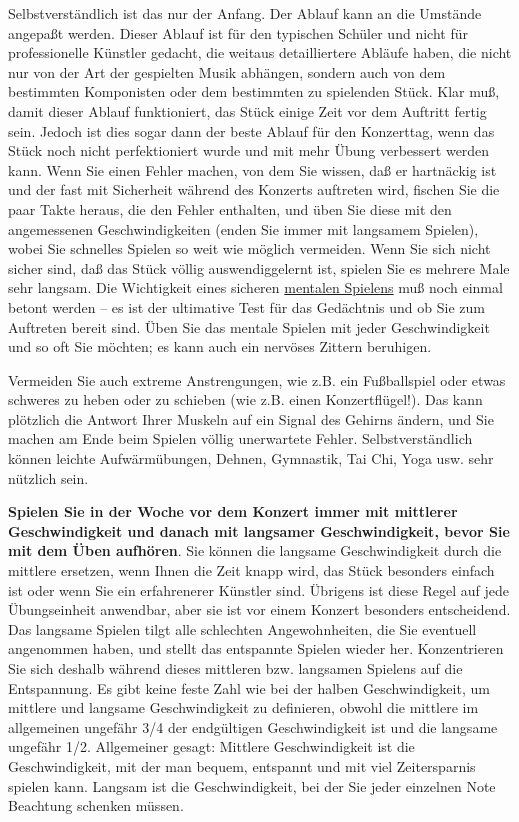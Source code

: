 Selbstverständlich ist das nur der Anfang.
Der Ablauf kann an die Umstände angepaßt werden.
Dieser Ablauf ist für den typischen Schüler und nicht für professionelle Künstler gedacht, die weitaus detailliertere Abläufe haben, die nicht nur von der Art der gespielten Musik abhängen, sondern auch von dem bestimmten Komponisten oder dem bestimmten zu spielenden Stück.
Klar muß, damit dieser Ablauf funktioniert, das Stück einige Zeit vor dem Auftritt fertig sein.
Jedoch ist dies sogar dann der beste Ablauf für den Konzerttag, wenn das Stück noch nicht perfektioniert wurde und mit mehr Übung verbessert werden kann.
Wenn Sie einen Fehler machen, von dem Sie wissen, daß er hartnäckig ist und der fast mit Sicherheit während des Konzerts auftreten wird, fischen Sie die paar Takte heraus, die den Fehler enthalten, und üben Sie diese mit den angemessenen Geschwindigkeiten (enden Sie immer mit langsamem Spielen), wobei Sie schnelles Spielen so weit wie möglich vermeiden.
Wenn Sie sich nicht sicher sind, daß das Stück völlig auswendiggelernt ist, spielen Sie es mehrere Male sehr langsam.
Die Wichtigkeit eines sicheren \hyperref[c1ii12mental]{mentalen Spielens} muß noch einmal betont werden -- es ist der ultimative Test für das Gedächtnis und ob Sie zum Auftreten bereit sind.
Üben Sie das mentale Spielen mit jeder Geschwindigkeit und so oft Sie möchten; es kann auch ein nervöses Zittern beruhigen.

Vermeiden Sie auch extreme Anstrengungen, wie z.B. ein Fußballspiel oder etwas schweres zu heben oder zu schieben (wie z.B. einen Konzertflügel!).
Das kann plötzlich die Antwort Ihrer Muskeln auf ein Signal des Gehirns ändern, und Sie machen am Ende beim Spielen völlig unerwartete Fehler.
Selbstverständlich können leichte Aufwärmübungen, Dehnen, Gymnastik, Tai Chi, Yoga usw. sehr nützlich sein.

\textbf{Spielen Sie in der Woche vor dem Konzert immer mit mittlerer Geschwindigkeit und danach mit langsamer Geschwindigkeit, bevor Sie mit dem Üben aufhören}.
Sie können die langsame Geschwindigkeit durch die mittlere ersetzen, wenn Ihnen die Zeit knapp wird, das Stück besonders einfach ist oder wenn Sie ein erfahrenerer Künstler sind.
Übrigens ist diese Regel auf jede Übungseinheit anwendbar, aber sie ist vor einem Konzert besonders entscheidend.
Das langsame Spielen tilgt alle schlechten Angewohnheiten, die Sie eventuell angenommen haben, und stellt das entspannte Spielen wieder her.
Konzentrieren Sie sich deshalb während dieses mittleren bzw. langsamen Spielens auf die Entspannung.
Es gibt keine feste Zahl wie bei der halben Geschwindigkeit, um mittlere und langsame Geschwindigkeit zu definieren, obwohl die mittlere im allgemeinen ungefähr 3/4 der endgültigen Geschwindigkeit ist und die langsame ungefähr 1/2.
Allgemeiner gesagt: Mittlere Geschwindigkeit ist die Geschwindigkeit, mit der man bequem, entspannt und mit viel Zeitersparnis spielen kann.
Langsam ist die Geschwindigkeit, bei der Sie jeder einzelnen Note Beachtung schenken müssen.

